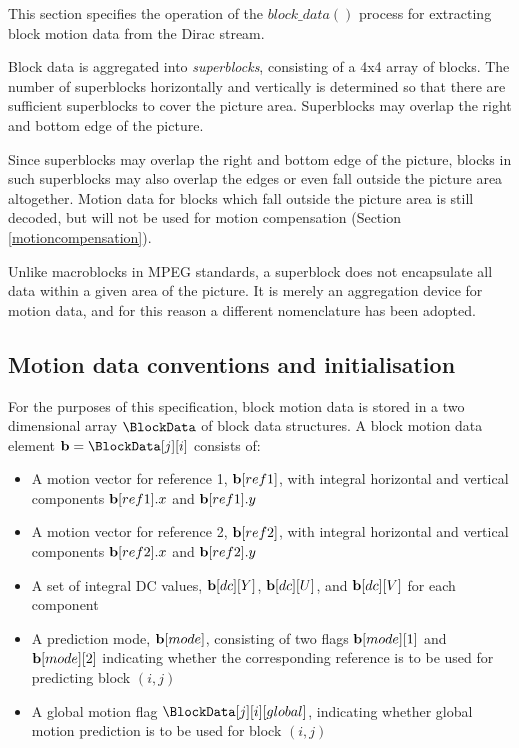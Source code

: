 
\label{motiondec}

This section specifies the operation of the $block\_data()$ process for extracting
block motion data from the Dirac stream. 

Block data is aggregated into {\em superblocks}, consisting of a 4x4 array of blocks. The number 
of superblocks horizontally and vertically is determined so that there are sufficient superblocks
to cover the picture area. Superblocks may overlap the right and bottom edge of the picture.

\begin{informative}
Since superblocks may overlap the right and bottom edge of the picture, blocks in such superblocks
may also overlap the edges or even fall outside the picture area altogether. Motion data for 
blocks which fall outside the picture area is still decoded, but will not be used for motion compensation 
(Section \ref{motioncompensation}). 

Unlike macroblocks in MPEG standards, a superblock does not encapsulate all data within a 
given area of the picture. It is merely an aggregation device for motion data, and for this reason
a different nomenclature has been adopted.
\end{informative}

\subsection{Motion data conventions and initialisation}

\label{motionconventions}

For the purposes of this specification, block motion data is stored in a two dimensional array 
$\BlockData$ of block data structures. A block motion data element ${\bf b}=\BlockData[j][i]$ consists of:

\begin{itemize}
\item A motion vector for reference 1, ${\bf b}[ref1]$, with integral horizontal and vertical components 
${\bf b}[ref1].x$ and ${\bf b}[ref1].y$
\item A motion vector for reference 2, ${\bf b}[ref2]$, with integral horizontal and vertical components 
${\bf b}[ref2].x$ and ${\bf b}[ref2].y$
\item A set of integral DC values, ${\bf b}[dc][Y]$, ${\bf b}[dc][U]$, and ${\bf b}[dc][V]$ for each component
\item A prediction mode, ${\bf b}[mode]$, consisting of two flags ${\bf b}[mode][1]$ and ${\bf b}[mode][2]$ 
indicating whether the corresponding reference is to be used for predicting block $(i,j)$
\item A global motion flag $\BlockData[j][i][global]$, indicating whether global motion prediction is to be used for block $(i,j)$
\end{itemize}


